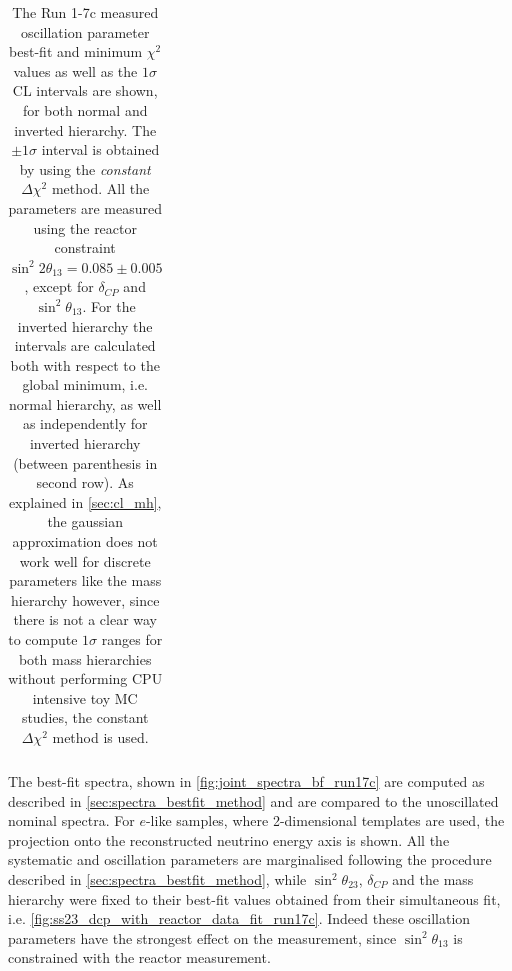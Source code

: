 \begin{table}[htb]
\begin{tabular}{| c | c || c | c | c || c | c | c |}
\hline
\end{tabular}
\caption{
The Run 1-7c measured oscillation parameter best-fit
and minimum $\chi^2$ 
values  
as well as the 
$1\sigma$ 
CL intervals are shown,
for both normal and inverted hierarchy. 
The $\pm1\sigma$ interval is obtained by using the 
\emph{constant} $\Delta \chi^2$ method.
All the parameters are measured using the reactor constraint 
$\sin^2 2\theta_{13} = 0.085 \pm 0.005 $
\cite{pdg_2014},
except for $\delta_{CP}$ and $\sin^2 \theta_{13}$.
For the inverted hierarchy the intervals are calculated both with respect to 
the global minimum, i.e. normal hierarchy, as well as 
independently for inverted hierarchy (between parenthesis in second row).
As explained in \cref{sec:cl_mh}, the gaussian approximation does not work well 
for discrete parameters like the mass hierarchy however, since there is not a clear way
to compute $1\sigma$ ranges for both mass hierarchies without performing
CPU intensive toy MC studies, the constant $\Delta \chi^2$ method is used.
}                                                                                                                                                                                          
\label{tab:joint_bestfit_run17c}
\end{table}







The best-fit spectra, shown in \cref{fig:joint_spectra_bf_run17c} are computed as described in \cref{sec:spectra_bestfit_method}
and are compared to the unoscillated nominal spectra.
For $e$-like samples, where 2-dimensional templates are used,
the projection onto the reconstructed neutrino energy axis is shown.
All the systematic and oscillation parameters are marginalised following the procedure described in \cref{sec:spectra_bestfit_method},
while $\sin^2\theta_{23}$, $\delta_{CP}$ and the mass hierarchy were fixed to their best-fit values 
obtained from their simultaneous fit, i.e. \cref{fig:ss23_dcp_with_reactor_data_fit_run17c}.
Indeed these oscillation parameters have the strongest effect on the measurement,
since $\sin^2\theta_{13}$ is constrained with the reactor measurement.

